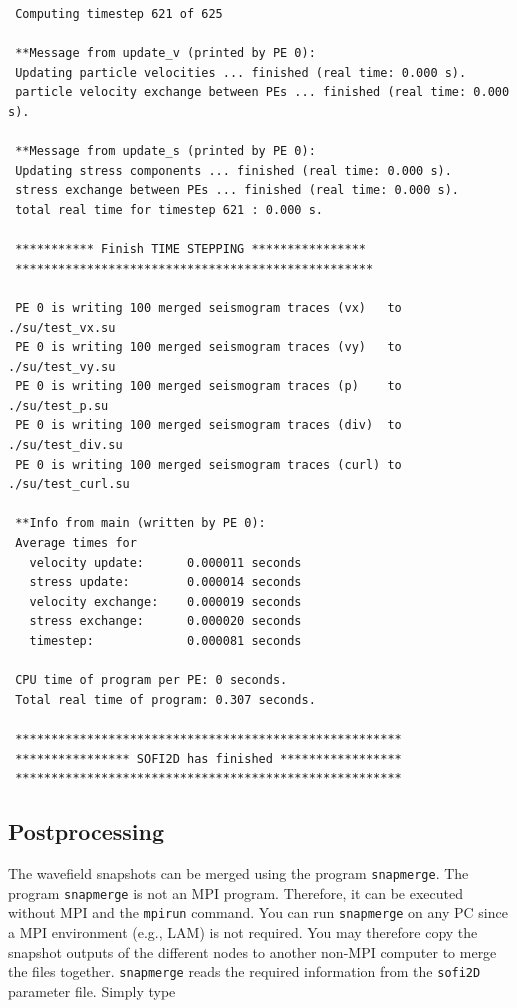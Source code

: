 \begin{verbatim}
 Computing timestep 621 of 625

 **Message from update_v (printed by PE 0):
 Updating particle velocities ... finished (real time: 0.000 s).
 particle velocity exchange between PEs ... finished (real time: 0.000 s).

 **Message from update_s (printed by PE 0):
 Updating stress components ... finished (real time: 0.000 s).
 stress exchange between PEs ... finished (real time: 0.000 s).
 total real time for timestep 621 : 0.000 s.

 *********** Finish TIME STEPPING ****************
 **************************************************

 PE 0 is writing 100 merged seismogram traces (vx)   to  ./su/test_vx.su
 PE 0 is writing 100 merged seismogram traces (vy)   to  ./su/test_vy.su
 PE 0 is writing 100 merged seismogram traces (p)    to  ./su/test_p.su
 PE 0 is writing 100 merged seismogram traces (div)  to  ./su/test_div.su
 PE 0 is writing 100 merged seismogram traces (curl) to  ./su/test_curl.su

 **Info from main (written by PE 0):
 Average times for
   velocity update:      0.000011 seconds
   stress update:        0.000014 seconds
   velocity exchange:    0.000019 seconds
   stress exchange:      0.000020 seconds
   timestep:             0.000081 seconds

 CPU time of program per PE: 0 seconds.
 Total real time of program: 0.307 seconds.

 ******************************************************
 **************** SOFI2D has finished *****************
 ******************************************************
\end{verbatim}  

\subsection{Postprocessing}
The wavefield snapshots can be merged using the program \texttt{snapmerge}. The program \texttt{snapmerge} is not an MPI program. Therefore, it can be executed without MPI and the \texttt{mpirun} command. You can run \texttt{snapmerge} on any PC since a MPI environment (e.g., LAM) is not required. You may therefore copy the snapshot outputs of the different nodes to another non-MPI computer to merge the files together. \texttt{snapmerge} reads the required information from the \texttt{sofi2D} parameter file. Simply type


